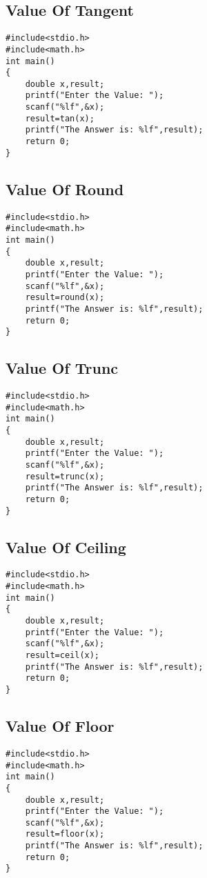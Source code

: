 \documentclass[a4paper,14pt]{article}
\begin{document}
\subsection{Value Of Tangent}
\vspace{0.5cm}
\begin{lstlisting}[caption={Value Of Tangent}]
#include<stdio.h>
#include<math.h>
int main()
{
    double x,result;
    printf("Enter the Value: ");
    scanf("%lf",&x);
    result=tan(x);
    printf("The Answer is: %lf",result);
    return 0;
}
\end{lstlisting}
\newpage

\subsection{Value Of Round}
\vspace{0.5cm}
\begin{lstlisting}[caption={Value Of Round}]
#include<stdio.h>
#include<math.h>
int main()
{
    double x,result;
    printf("Enter the Value: ");
    scanf("%lf",&x);
    result=round(x);
    printf("The Answer is: %lf",result);
    return 0;
}
\end{lstlisting}
\newpage

\subsection{Value Of Trunc}
\vspace{0.5cm}
\begin{lstlisting}[caption={Value Of Trunc}]
#include<stdio.h>
#include<math.h>
int main()
{
    double x,result;
    printf("Enter the Value: ");
    scanf("%lf",&x);
    result=trunc(x);
    printf("The Answer is: %lf",result);
    return 0;
}
\end{lstlisting}
\newpage

\subsection{Value Of Ceiling}
\vspace{0.5cm}
\begin{lstlisting}[caption={Value Of Ceiling}]
#include<stdio.h>
#include<math.h>
int main()
{
    double x,result;
    printf("Enter the Value: ");
    scanf("%lf",&x);
    result=ceil(x);
    printf("The Answer is: %lf",result);
    return 0;
}
\end{lstlisting}
\newpage

\subsection{Value Of Floor}
\vspace{0.5cm}
\begin{lstlisting}[caption={Value Of Floor}]
#include<stdio.h>
#include<math.h>
int main()
{
    double x,result;
    printf("Enter the Value: ");
    scanf("%lf",&x);
    result=floor(x);
    printf("The Answer is: %lf",result);
    return 0;
}
\end{lstlisting}
\newpage
\end{document}
